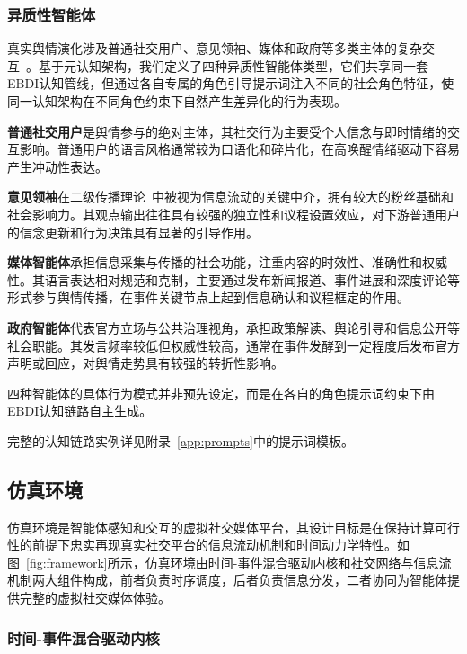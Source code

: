 \documentclass[a4paper,fleqn]{cas-sc}
\begin{document}
\subsubsection{异质性智能体}

真实舆情演化涉及普通社交用户、意见领袖、媒体和政府等多类主体的复杂交互~\citep{chen_evolution_2025,wu_public_2023}。基于元认知架构，我们定义了四种异质性智能体类型，它们共享同一套EBDI认知管线，但通过各自专属的角色引导提示词注入不同的社会角色特征，使同一认知架构在不同角色约束下自然产生差异化的行为表现。

\textbf{普通社交用户}是舆情参与的绝对主体，其社交行为主要受个人信念与即时情绪的交互影响。普通用户的语言风格通常较为口语化和碎片化，在高唤醒情绪驱动下容易产生冲动性表达。

\textbf{意见领袖}在二级传播理论~\citep{katz_personal_1955}中被视为信息流动的关键中介，拥有较大的粉丝基础和社会影响力。其观点输出往往具有较强的独立性和议程设置效应，对下游普通用户的信念更新和行为决策具有显著的引导作用。

\textbf{媒体智能体}承担信息采集与传播的社会功能，注重内容的时效性、准确性和权威性。其语言表达相对规范和克制，主要通过发布新闻报道、事件进展和深度评论等形式参与舆情传播，在事件关键节点上起到信息确认和议程框定的作用。

\textbf{政府智能体}代表官方立场与公共治理视角，承担政策解读、舆论引导和信息公开等社会职能。其发言频率较低但权威性较高，通常在事件发酵到一定程度后发布官方声明或回应，对舆情走势具有较强的转折性影响。

四种智能体的具体行为模式并非预先设定，而是在各自的角色提示词约束下由EBDI认知链路自主生成。

完整的认知链路实例详见附录~\ref{app:prompts}中的提示词模板。

\subsection{仿真环境}\label{subsec:env}

仿真环境是智能体感知和交互的虚拟社交媒体平台，其设计目标是在保持计算可行性的前提下忠实再现真实社交平台的信息流动机制和时间动力学特性。如图~\ref{fig:framework}所示，仿真环境由时间-事件混合驱动内核和社交网络与信息流机制两大组件构成，前者负责时序调度，后者负责信息分发，二者协同为智能体提供完整的虚拟社交媒体体验。

\subsubsection{时间-事件混合驱动内核}
\end{document}

